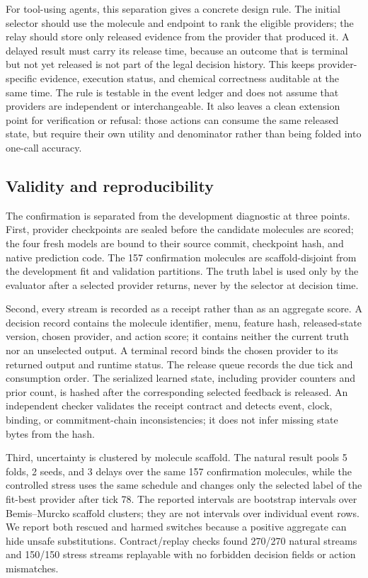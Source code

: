 \documentclass[sigconf,anonymous]{aamas}
\begin{document}
For tool-using agents, this separation gives a concrete design rule. The initial selector should use the molecule and endpoint to rank the eligible providers; the relay should store only released evidence from the provider that produced it. A delayed result must carry its release time, because an outcome that is terminal but not yet released is not part of the legal decision history. This keeps provider-specific evidence, execution status, and chemical correctness auditable at the same time. The rule is testable in the event ledger and does not assume that providers are independent or interchangeable. It also leaves a clean extension point for verification or refusal: those actions can consume the same released state, but require their own utility and denominator rather than being folded into one-call accuracy.

\subsection{Validity and reproducibility}
The confirmation is separated from the development diagnostic at three points. First, provider checkpoints are sealed before the candidate molecules are scored; the four fresh models are bound to their source commit, checkpoint hash, and native prediction code. The 157 confirmation molecules are scaffold-disjoint from the development fit and validation partitions. The truth label is used only by the evaluator after a selected provider returns, never by the selector at decision time.

Second, every stream is recorded as a receipt rather than as an aggregate score. A decision record contains the molecule identifier, menu, feature hash, released-state version, chosen provider, and action score; it contains neither the current truth nor an unselected output. A terminal record binds the chosen provider to its returned output and runtime status. The release queue records the due tick and consumption order. The serialized learned state, including provider counters and prior count, is hashed after the corresponding selected feedback is released. An independent checker validates the receipt contract and detects event, clock, binding, or commitment-chain inconsistencies; it does not infer missing state bytes from the hash.

Third, uncertainty is clustered by molecule scaffold. The natural result pools 5 folds, 2 seeds, and 3 delays over the same 157 confirmation molecules, while the controlled stress uses the same schedule and changes only the selected label of the fit-best provider after tick 78. The reported intervals are bootstrap intervals over Bemis--Murcko scaffold clusters; they are not intervals over individual event rows. We report both rescued and harmed switches because a positive aggregate can hide unsafe substitutions. Contract/replay checks found 270/270 natural streams and 150/150 stress streams replayable with no forbidden decision fields or action mismatches.
\end{document}
